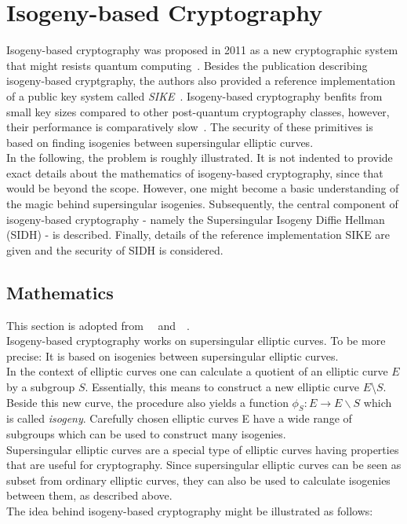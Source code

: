\section{Isogeny-based Cryptography} \label{sec:isogeny-based_crypto}
Isogeny-based cryptography was proposed in 2011 as a new cryptographic system that might resists quantum computing~\parencite{jao2011towards}. Besides the publication describing isogeny-based cryptgraphy, the authors also provided a reference implementation of a public key system called \textit{\gls{SIKE}}~\parencite{sike2020spec}. Isogeny-based cryptography benfits from small key sizes compared to other post-quantum cryptography classes, however, their performance is comparatively slow~\parencite{sike2020spec}. The security of these primitives is based on finding isogenies between supersingular elliptic curves.\\
In the following, the problem is roughly illustrated. It is not indented to provide exact details about the mathematics of isogeny-based cryptography, since that would be beyond the scope. However, one might become a basic understanding of the magic behind supersingular isogenies. Subsequently, the central component of isogeny-based cryptography - namely the Supersingular Isogeny Diffie Hellman (\gls{SIDH}) - is described. Finally, details of the reference implementation \gls{SIKE} are given and the security of \gls{SIDH} is considered.

\subsection{Mathematics}
This section is adopted from~~\parencite{urbanik2017friendly} and~~\parencite{costello2019supersingular}.\\
Isogeny-based cryptography works on supersingular elliptic curves. To be more precise: It is based on isogenies between supersingular elliptic curves.
\\
In the context of elliptic curves one can calculate a quotient of an elliptic curve $E$ by a subgroup $S$. Essentially, this means to construct a new elliptic curve $E$\textbackslash $S$.
Beside this new curve, the procedure also yields a function $\phi_S: E \to E \backslash S$ which is called \textit{isogeny}. Carefully chosen elliptic curves E have a wide range of subgroups which can be used to construct many isogenies.
\\
Supersingular elliptic curves are a special type of elliptic curves having properties that are useful for cryptography. Since supersingular elliptic curves can be seen as subset from ordinary elliptic curves, they can also be used to calculate isogenies between them, as described above.
\\
The idea behind isogeny-based cryptography might be illustrated as follows:


